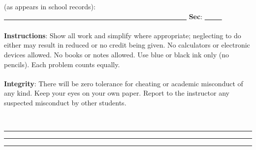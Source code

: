\documentclass[12pt]{article}
\begin{document}


(as appears in school records): \underline{ \ \ \ \ \ \ \ \ \ \ \ \ \ \ \ \ \ \ \ \ \ \ \ \ \ \ \ \ \ \ \ \ \ \ \ \ \ \ \ \ \ \ \ \ \ \ \ \ \ \ \ \ \ } {\bf Sec}: \underline{ \ \ \ \ \ }\\
\ \\
{\bf Instructions}: Show all work and simplify where appropriate; neglecting to do either may result in reduced or no credit being given. No calculators or electronic devices allowed. No books or notes allowed. Use blue or black ink only (no pencils). Each problem counts equally.\\
\ \\
{\bf Integrity}: There will be zero tolerance for cheating or academic misconduct of any kind. Keep your eyes on your own paper. Report to the instructor any suspected misconduct by other students.

\ \\ \hrule\hrule\hrule \ \\



\newcommand{\sectiontoc}[1]{\section*{#1}\addcontentsline{toc}{section}{#1}}
\newcommand{\subsectiontoc}[1]{\subsection*{#1}\addcontentsline{toc}{subsection}{#1}}
\newcommand{\subsubsectiontoc}[1]{\subsubsection*{#1}\addcontentsline{toc}{subsubsection}{#1}}
\end{document}
